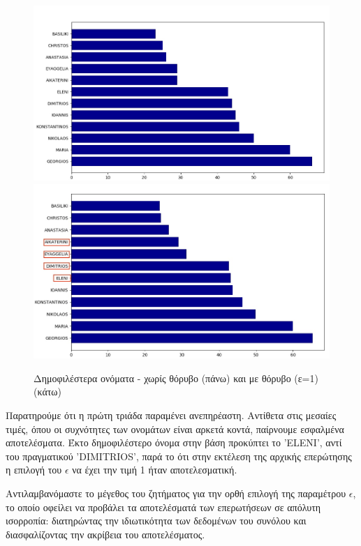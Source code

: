 \begin{figure} [ht]
\begin{center}
  \includegraphics[scale=0.41]{images/e=1.jpg}
  \includegraphics[scale=0.41]{images/e=2.jpg}
  \caption{Δημοφιλέστερα ονόματα - χωρίς θόρυβο (πάνω) και με θόρυβο (ε=1) (κάτω)}
  \end{center}
\end{figure}

Παρατηρούμε ότι η πρώτη τριάδα παραμένει ανεπηρέαστη. Αντίθετα στις μεσαίες τιμές, όπου οι συχνότητες των ονομάτων είναι αρκετά κοντά, παίρνουμε εσφαλμένα αποτελέσματα. Έκτο δημοφιλέστερο όνομα στην βάση προκύπτει το '\textlatin{ELENI}', αντί του πραγματικού '\textlatin{DIMITRIOS}', παρά το ότι στην εκτέλεση της αρχικής επερώτησης η επιλογή του $\epsilon$ να έχει την τιμή 1 ήταν αποτελεσματική.

Αντιλαμβανόμαστε το μέγεθος του ζητήματος για την ορθή επιλογή της παραμέτρου $\epsilon$, το οποίο οφείλει να προβάλει τα αποτελέσματά των επερωτήσεων σε απόλυτη ισορροπία: διατηρώντας την ιδιωτικότητα των δεδομένων του συνόλου και διασφαλίζοντας την ακρίβεια του αποτελέσματος.




